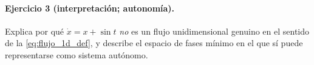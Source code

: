 \paragraph{Ejercicio 3 (interpretación; autonomía).} Explica por qué $\dot{x} = x + \sin t$ \emph{no} es un flujo unidimensional genuino en el sentido de la \cref{eq:flujo_1d_def}, y describe el espacio de fases mínimo en el que sí puede representarse como sistema autónomo.

